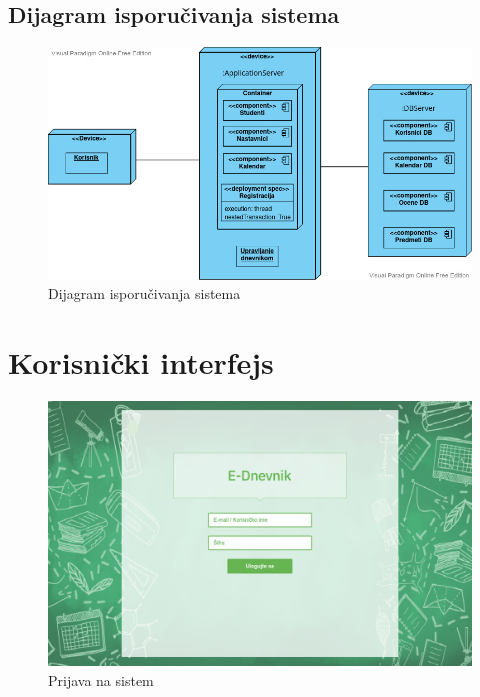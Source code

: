 \documentclass{article}
\begin{document}
\newpage
\subsection{Dijagram isporučivanja sistema}
\begin{figure} [!ht]
    \begin{center}
        \includegraphics[scale=0.5]{imgs/Dijagram isporucivanja.vpd.jpg}
    \end{center}
\caption{Dijagram isporučivanja sistema}
\end{figure}

\newpage
\section{Korisnički interfejs}

\begin{figure} [!ht]
    \begin{center}
        \includegraphics[scale=0.3]{../UI/Administrator/LoginPage.png}
    \end{center}
\caption{Prijava na sistem}
\end{figure}
\end{document}
